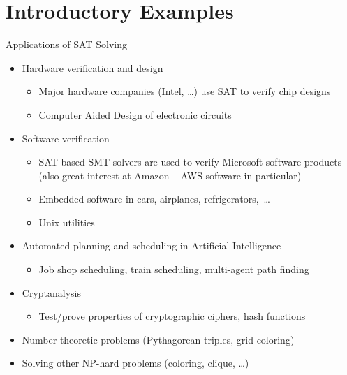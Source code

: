 \documentclass[t]{sdqbeamer}
\begin{document}
\section{Introductory Examples}

\begin{frame}{Applications of SAT Solving}
\begin{minipage}{0.72\textwidth}
	\begin{itemize}
		\item Hardware verification and design
		\begin{itemize}
			\item Major hardware companies (Intel, \dots) use SAT to verify chip designs
			\item Computer Aided Design of electronic circuits
		\end{itemize}
		\item Software verification
		\begin{itemize}
			\item SAT-based SMT solvers are used to verify Microsoft software products\\
			(also great interest at Amazon -- AWS software in particular)
			\item Embedded software in cars, airplanes, refrigerators,~\dots
			\item Unix utilities
		\end{itemize}
		\item Automated planning and scheduling in Artificial Intelligence
		\begin{itemize}
			\item Job shop scheduling, train scheduling, multi-agent path finding
		\end{itemize}
		\item Cryptanalysis
		\begin{itemize}
			\item Test/prove properties of cryptographic ciphers, hash functions
		\end{itemize}
		\item Number theoretic problems (Pythagorean triples, grid coloring)
		\item Solving other NP-hard problems (coloring, clique, \dots)
	\end{itemize}	
\end{minipage}%
\begin{minipage}{0.28\textwidth}

\end{minipage}
\end{frame}
\end{document}
